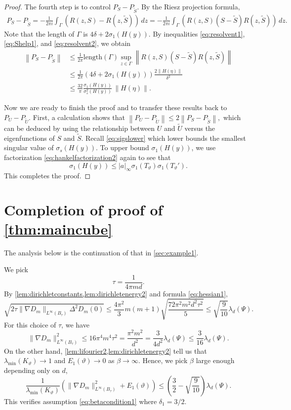 \documentclass[11pt]{article}
\theoremstyle{definition}
\numberwithin{theorem}{section}
\numberwithin{lemma}{section}
\numberwithin{equation}{section}
\renewcommand{\tilde}{\widetilde}
\newcommand{\norm}[1]{{\left\|#1\right\|}}
\numberwithin{equation}{section}
\begin{document}
\begin{proof}
		The fourth step is to control $P_S-P_{\tilde S}$. By the Riesz projection formula,
		\begin{align*}
			P_S-P_{\tilde S}
			=-\frac 1 {2\pi i} \int_\Gamma \left(R(z,S)-R(z,\tilde S) \right)\, dz
			=-\frac 1 {2\pi i} \int_\Gamma \left(R(z,S)(S-\tilde S)R(z,\tilde S) \right)\, dz. 
		\end{align*}
		Note that the length of $\Gamma$ is $4\delta + 2 \sigma_1(H(y))$. By inequalities \eqref{eq:resolvent1}, \eqref{eq:Shelp1}, and \eqref{eq:resolvent2}, we obtain
		\begin{align*}
			\norm{P_S-P_{\tilde S}}
			&\leq \frac 1{2\pi} \text{length}(\Gamma) \sup_{z\in \Gamma} \norm{R(z,S)(S-\tilde S)R(z,\tilde S)} \\
			&\leq \frac 1{2\pi} \left(4\delta + 2 \sigma_1(H(y)) \right)  \frac{2 \|H(\eta)\|}{\delta^2} \\
			&\leq \frac {32}{\pi} \frac{\sigma_1(H(y))}{\sigma_s^2(H(y))} \, \|H(\eta)\|.
		\end{align*}
		
		Now we are ready to finish the proof and to transfer these results back to $P_U-P_{\tilde U}$. First, a calculation shows that
		$
		\norm{P_U-P_{\tilde U}}
		\leq 2\norm{P_S-P_{\tilde S}}, 
		$
		which can be deduced by using the relationship between $U$ and $\tilde U$ versus the eigenfunctions of $S$ and $\tilde S$. Recall \eqref{eq:sigslower} which lower bounds the smallest singular value of $\sigma_s(H(y))$. To upper bound $\sigma_1(H(y))$, we use factorization \eqref{eq:hankelfactorization2} again to see that
		$$
		\sigma_1(H(y))
		\leq |a|_\infty \sigma_1(T_\vartheta) \sigma_1(T_\vartheta').
		$$
		This completes the proof.
	\end{proof}
	

	\section{Completion of proof of \cref{thm:maincube}}
	
	\label{sec:prooflemmas1}
	\label{proof:maincube} 
The analysis below is the continuation of that in \cref{sec:example1}.
	
	We pick 
	$$
	\tau= \frac{1}{4\pi m d}.
	$$
	By \cref{lem:dirichletconstants,lem:dirichletenergy2} and formula \eqref{eq:hessian1},  
	$$
	\sqrt{2 \tau \|\nabla D_m\|_{L^\infty(B_\tau)} \Delta^2 D_m(0)} 
	\leq \frac{4\pi^2}3 m (m+1) \sqrt{\frac{72\pi^2 m^2 d^2 \tau^2}{5}} 
	\leq \sqrt{ \frac 9 {10}} \lambda_d(\Psi).
	$$
	For this choice of $\tau$, we have 
	$$
	\|\nabla D_m\|_{L^\infty(B_\tau)}^2
	\leq 16 \pi^4 m^4 \tau^2 
	= \frac{ \pi^2 m^2}{d^2}
	= \frac{3}{4d^2} \lambda_d(\Psi)
	\leq \frac{3}{16}\lambda_d(\Psi). 
	$$
	On the other hand, \cref{lem:lifourier2,lem:dirichletenergy2} tell us that $\lambda_{\min}(K_\vartheta)\to 1$ and $E_1(\vartheta)\to 0$ as $\beta\to\infty$. Hence, we pick $\beta$ large enough depending only on $d$, 
	$$
	\frac{1}{\lambda_{\min}(K_\vartheta)} \left(\|\nabla D_m\|_{L^\infty(B_\tau)}^2 + E_1(\vartheta) \right)
	\leq \left( \frac 3 2 - \sqrt{ \frac 9 {10}} \right) \lambda_d(\Psi).
	$$
	This verifies assumption \eqref{eq:betacondition1} where $\delta_1=3/2$. 
	
\end{document}
